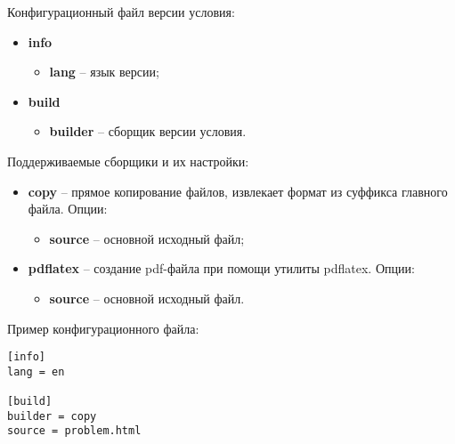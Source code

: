 Конфигурационный файл версии условия:
\begin{itemize}
    \item \textbf{info}
        \begin{itemize}
            \item \textbf{lang} -- язык версии;
        \end{itemize}
    \item \textbf{build}
        \begin{itemize}
            \item \textbf{builder} -- сборщик версии условия.
        \end{itemize}
\end{itemize}

Поддерживаемые сборщики и их настройки:
\begin{itemize}
    \item \textbf{copy} -- прямое копирование файлов,
        извлекает формат из суффикса главного файла.
        Опции:
        \begin{itemize}
            \item \textbf{source} -- основной исходный файл;
        \end{itemize}
    \item \textbf{pdflatex} -- создание pdf-файла при помощи утилиты pdflatex.
        Опции:
        \begin{itemize}
            \item \textbf{source} -- основной исходный файл.
        \end{itemize}
\end{itemize}

Пример конфигурационного файла:
\begin{verbatim}
[info]
lang = en

[build]
builder = copy
source = problem.html
\end{verbatim}
